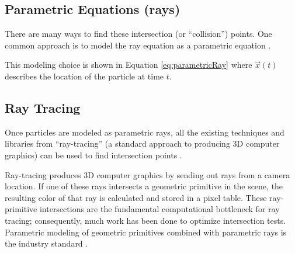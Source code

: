 	\subsection{Parametric Equations (rays)}

There are many ways to find these intersection (or ``collision'') points. One common approach is to model the ray equation as a parametric equation \cite{glassner1989introduction} \cite{fundamentals}.

 {
	\label{eq:parametricRay}
}

This modeling choice is shown in Equation \eqref{eq:parametricRay} where $\vec{x}(t)$ describes the location of the particle at time $t$.


	\subsection{Ray Tracing}

Once particles are modeled as parametric rays, all the existing techniques and libraries from ``ray-tracing'' (a standard approach to producing 3D computer graphics) can be used to find intersection points \cite{glassner1989introduction} \cite{fundamentals}.

Ray-tracing produces 3D computer graphics by sending out rays from a camera location. If one of these rays intersects a geometric primitive in the scene, the resulting color of that ray is calculated and stored in a pixel table. These ray-primitive intersections are the fundamental computational bottleneck for ray tracing; consequently, much work has been done to optimize intersection tests. Parametric modeling of geometric primitives combined with parametric rays is the industry standard \cite{glassner1989introduction} \cite{fundamentals}.



